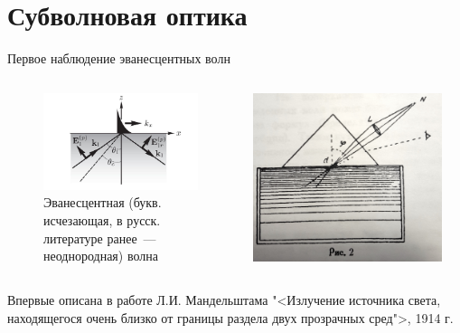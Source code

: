 \documentclass[9pt, compress, xcolor=table]{beamer}
\begin{document}
\section{Субволновая оптика}


\begin{frame}{Первое наблюдение эванесцентных волн}

\begin{columns}[c]
\column{6cm}
\begin{center}
\begin{figure}
\centering
\includegraphics[width=0.9 \textwidth]{ew}
\\Эванесцентная (букв. исчезающая, в русск. литературе ранее~--- неоднородная) волна
\end{figure}
\end{center}
 
 \column{6cm}
\begin{center}
\includegraphics[width=0.9\textwidth]{mand2}
\end{center}
\end{columns}

\begin{block} 

Впервые описана в работе Л.И. Мандельштама "<Излучение источника света, находящегося очень близко от границы раздела двух прозрачных сред">, 1914 г.

\end{block}

\end{frame}
\end{document}
